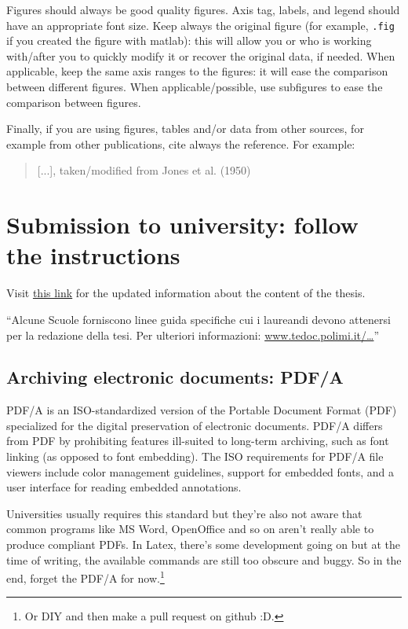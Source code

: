 Figures should always be good quality figures.
Axis tag, labels, and legend should have an appropriate font size.
Keep always the original figure (for example, \verb!.fig! if you created the figure with matlab): this will allow you or who is working with/after you to quickly modify it or recover the original data, if needed.
When applicable, keep the same axis ranges to the figures: it will ease the comparison between different figures.
When applicable/possible, use subfigures to ease the comparison between figures.

Finally, if you are using figures, tables and/or data from other sources, for example from other publications, cite always the reference. 
For example: \\
\blockquote{[...], taken/modified from Jones et al. (1950)}

\section{Submission to university: follow the instructions}
Visit \href{http://www.tedoc.polimi.it/tesilaurea/Consegna-tesi-di-laurea-(vecchio-ordinamento-e-specialistica)}{this link} for the updated information about the content of the thesis.

\enquote{Alcune Scuole forniscono linee guida specifiche cui i laureandi devono attenersi per la redazione della tesi. Per ulteriori informazioni:
\href{http://www.tedoc.polimi.it/download/lauree_magistrali/201406_POLITesi_Info_specifiche_scuole.pdf}{www.tedoc.polimi.it/\ldots}}

\subsection{Archiving electronic documents: PDF/A}
PDF/A is an ISO-standardized version of the Portable Document Format (PDF) specialized for the digital preservation of electronic documents. PDF/A differs from PDF by prohibiting features ill-suited to long-term archiving, such as font linking (as opposed to font embedding). The ISO requirements for PDF/A file viewers include color management guidelines, support for embedded fonts, and a user interface for reading embedded annotations.

Universities usually requires this standard but they're also not aware that common programs like MS Word, OpenOffice and so on aren't really able to produce compliant PDFs. In Latex, there's some development going on but at the time of writing, the available commands are still too obscure and buggy. So in the end, forget the PDF/A for now.\footnote{Or DIY and then make a pull request on github :D.}
